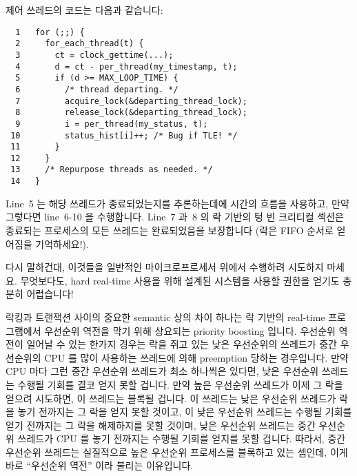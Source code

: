 {	제어 쓰레드의 코드는 다음과 같습니다:
	\iffalse

	The control thread's code is as follows:
	\fi

	\vspace{5pt}
	\begin{minipage}[t]{\columnwidth}
	\scriptsize
\begin{verbatim}
  1   for (;;) {
  2     for_each_thread(t) {
  3       ct = clock_gettime(...);
  4       d = ct - per_thread(my_timestamp, t);
  5       if (d >= MAX_LOOP_TIME) {
  6         /* thread departing. */
  7         acquire_lock(&departing_thread_lock);
  8         release_lock(&departing_thread_lock);
  9         i = per_thread(my_status, t);
 10         status_hist[i]++; /* Bug if TLE! */
 11       }
 12     }
 13     /* Repurpose threads as needed. */
 14   }
\end{verbatim}
	\end{minipage}
	\vspace{5pt}

	Line~5 는 해당 쓰레드가 종료되었는지를 추론하는데에 시간의 흐름을
	사용하고, 만약 그렇다면 line~6-10 을 수행합니다.
	Line~7 과~8 의 락 기반의 텅 빈 크리티컬 섹션은 종료되는 프로세스의 모든
	쓰레드는 완료되었음을 보장합니다 (락은 FIFO 순서로 얻어짐을
	기억하세요!).

	다시 말하건대, 이것들을 일반적인 마이크로프로세서 위에서 수행하려
	시도하지 마세요.
	무엇보다도, hard real-time 사용을 위해 설계된 시스템을 사용할 권한을
	얻기도 충분히 어렵습니다!
	\iffalse

	Line~5 uses the passage of time to deduce that the thread
	has exited, executing lines~6-10 if so.
	The empty lock-based critical section on lines~7 and~8
	guarantees that any thread in the process of exiting
	completes (remember that locks are granted in FIFO order!).

	Once again, do not try this sort of thing on commodity
	microprocessors.
	After all, it is difficult enough to get right on systems
	specifically designed for hard real-time use!
	\fi
} \QuickQuizEnd

락킹과 트랜잭션 사이의 중요한 semantic 상의 차이 하나는 락 기반의 real-time
프로그램에서 우선순위 역전을 막기 위해 상요되는 priority boosting 입니다.
우선순위 역전이 일어날 수 있는 한가지 경우는 락을 쥐고 있는 낮은 우선순위의
쓰레드가 중간 우선순위의 CPU 를 많이 사용하는 쓰레드에 의해 preemption 당하는
경우입니다.
만약 CPU 마다 그런 중간 우선순위 쓰레드가 최소 하나씩은 있다면, 낮은 우선순위
쓰레드는 수행될 기회를 결코 얻지 못할 겁니다.
만약 높은 우선순위 쓰레드가 이제 그 락을 얻으려 시도하면, 이 쓰레드는 블록될
겁니다.
이 쓰레드는 낮은 우선순위 쓰레드가 락을 놓기 전까지는 그 락을 얻지 못할 것이고,
이 낮은 우선순위 쓰레드는 수행될 기회를 얻기 전까지는 그 락을 해제하지를 못할
것이며, 낮은 우선순위 쓰레드는 중간 우선순위 쓰레드가 CPU 를 놓기 전까지는
수행될 기회를 얻지를 못할 겁니다.
따라서, 중간 우선순위 쓰레드는 실질적으로 높은 우선순위 프로세스를 블록하고
있는 셈인데, 이게 바로 ``우선순위 역전'' 이라 불리는 이유입니다.
\iffalse

